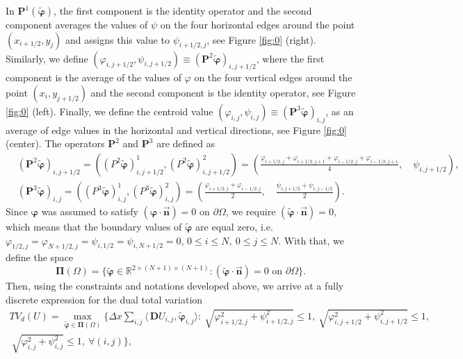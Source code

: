 \documentclass[reqno,a4paper,12pt]{amsart}
\begin{document}
In  $\bm{P}^1(\widetilde{\bm{\varphi}})$, the first component is the identity operator and the second component averages the values of $\psi$ on the four horizontal edges around the point $(x_{i+1/2},y_j)$
and assigns this value to $\psi_{i+1/2,j}$, see Figure \ref{fig:0} (right).
Similarly, we define $(\varphi_{i,j+1/2},  \psi_{i,j+1/2})\equiv(\bm{P}^2 \widetilde{\bm{\varphi}})_{i,j+1/2}$, where the first component is the average of the values of $\varphi$ on the four vertical edges around the point $(x_{i},y_{j+1/2})$ and the second component is the identity operator, see Figure \ref{fig:0} (left). Finally, we define the centroid value  $(\varphi_{i,j},  \psi_{i,j}) \equiv (\bm P^3 \widetilde{\bm{\varphi}})_{i,j}$, as an average of edge values in the horizontal and vertical directions, see Figure \ref{fig:0} (center). The operators  $\bm{P}^2$ and $\bm{P}^3$ are defined as
\begin{align}
&(\bm{P}^2 \widetilde{\bm{\varphi}})_{i,j+1/2} = \left((P^2 \widetilde{\bm{\varphi}})^1_{i,j+1/2}, (P^2 \widetilde{\bm{\varphi}})^2_{i,j+1/2} \right) =  \left(         \frac{\varphi_{i+1/2,j}+\varphi_{i+1/2,j+1}+\varphi_{i-1/2,j}+\varphi_{i-1/2,j+1}}{4}, \quad  \psi_{i,j+1/2} \right),     \label{eq34} \\
&(\bm{P}^3 \widetilde{\bm{\varphi}})_{i,j} = \left((P^3 \widetilde{\bm{\varphi}})^1_{i,j}, (P^3 \widetilde{\bm{\varphi}})^2_{i,j} \right) = \left(\frac{\varphi_{i+1/2,j}+\varphi_{i-1/2,j}}{2}, \quad  \frac{\psi_{i,j+1/2}+\psi_{i,j-1/2}}{2} \right). \label{eq35}
\end{align}
Since $\bm{\varphi}$ was assumed to satisfy $( \bm{\varphi} \cdot \vec{\bm n} )= 0$ on $\partial \Omega$, we require $( \widetilde{\bm{\varphi}} \cdot \vec{\bm n} )= 0$, which means that the boundary values of $\widetilde{\bm{\varphi}}$ are equal zero, i.e. $\varphi_{1/2,j}=\varphi_{N+1/2,j}= \psi_{i,1/2}= \psi_{i,N+1/2}=0$, $0\leq i \leq N, ~0\leq j \leq N$. With that, we define the space
$$\bm{\Pi}(\Omega) = \{ \widetilde{\bm{\varphi}} \in \mathbb{R}^{2 \times (N+1) \times (N+1)} : ( \widetilde{\bm{\varphi}} \cdot \vec{\bm n} )= 0 \text{ on } \partial \Omega \}.$$
Then, using the constraints and notations developed above, we arrive at a fully discrete expression for the dual total variation \cite{Condat}
\begin{multline}
    TV_d(U) = \max_{\widetilde{\bm{\varphi}} \in \bm{\Pi}(\Omega)} \Bigg\{ \Delta x \sum_{i,j} \langle\, \bm{D}U _{i,j}, \widetilde{\bm{\varphi}}_{i,j} \rangle : ~\sqrt{\varphi_{i+1/2,j}^2 + \psi_{i+1/2,j}^2} \leq 1, ~\sqrt{\varphi_{i,j+1/2}^2 + \psi_{i,j+1/2}^2} \leq 1, \\ ~\sqrt{\varphi_{i,j}^2 + \psi^2_{i,j}} \leq 1, ~\forall (i,j) \Bigg\},
    \label{eq36}
\end{multline}
\end{document}
